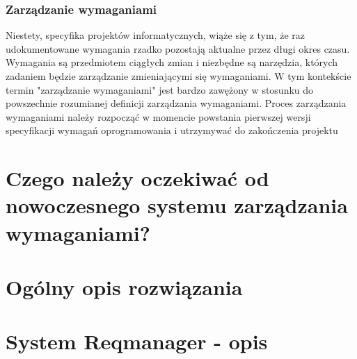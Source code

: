       \subsubsection{Zarządzanie wymaganiami}

        Niestety, specyfika projektów informatycznych, wiąże się z tym, że raz udokumentowane wymagania rzadko pozostają aktualne przez długi okres czasu. Wymagania są przedmiotem ciągłych zmian i niezbędne są narzędzia, których zadaniem będzie zarządzanie zmieniającymi się wymaganiami. W tym kontekście termin "zarządzanie wymaganiami" jest bardzo zawężony w stosunku do powszechnie rozumianej definicji zarządzania wymaganiami. Proces zarządzania wymaganiami należy rozpocząć w momencie powstania pierwszej wersji specyfikacji wymagań oprogramowania i utrzymywać do zakończenia projektu 

  \section{Czego należy oczekiwać od nowoczesnego systemu zarządzania wymaganiami?}
  \section{Ogólny opis rozwiązania}
  \section{System Reqmanager - opis}
